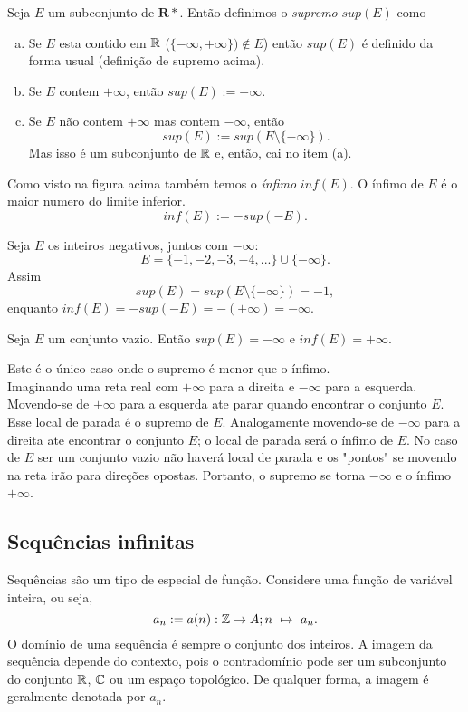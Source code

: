       \begin{definition}
         Seja $E$ um subconjunto de $\mathbf{R*}$. Então definimos o 
         \emph{supremo} $sup(E)$ como 
         \begin{enumerate}[(a)]
            \item 
               Se $E$ esta contido em $\mathbb{R}$ ($\{-\infty,+\infty\}) \notin E$) 
               então $sup(E)$ é definido da forma usual (definição 
               de supremo acima).
            \item
               Se $E$ contem $+\infty$, então $sup(E) := +\infty$.
            \item
               Se $E$ não contem $+\infty$ mas contem $-\infty$, então 
               $$sup(E):= sup(E\setminus \{-\infty\}).$$ Mas isso 
               é um subconjunto de $\mathbb{R}$ e, então, cai no item (a).
         \end{enumerate}
         Como visto na figura acima também temos o \emph{ínfimo} $inf(E)$. 
         O ínfimo de $E$ é o maior numero do limite inferior.
         $$inf(E):=-sup(-E).$$
      \end{definition}
      \begin{exmp}
         Seja $E$ os inteiros negativos, juntos com $-\infty$:
         $$E = \{-1,-2,-3,-4,...\}\cup \{-\infty\}.$$
         Assim $$sup(E) = sup(E\setminus \{-\infty\}) = -1,$$
         enquanto $inf(E) = -sup(-E)=-(+\infty)=-\infty$.
      \end{exmp}
      \begin{stat}
         Seja $E$ um conjunto vazio. Então $sup(E) = -\infty$ e 
         $inf(E) = +\infty$.
      \end{stat}
      Este é o único caso onde o supremo é menor que o ínfimo.\\
      Imaginando uma reta real com $+\infty$ para a direita e $-\infty$ 
      para a esquerda. Movendo-se de $+\infty$ para a esquerda 
      ate parar quando encontrar o conjunto $E$. Esse local de parada 
      é o supremo de $E$. Analogamente movendo-se de $-\infty$ para 
      a direita ate encontrar o conjunto $E$; o local de parada será 
      o ínfimo de $E$. No caso de $E$ ser um conjunto vazio não 
      haverá local de parada e os "pontos" se movendo na reta 
      irão para direções opostas. Portanto, o supremo se torna 
      $-\infty$ e o ínfimo $+\infty$.
   \subsection{Sequências infinitas}
      Sequências são um tipo de especial de função. 
      Considere uma função de variável inteira, ou seja, 
      $$a_{n} := a(n): \mathbb{Z} \to A; n\ \mapsto\ a_{n}.$$
      O domínio de uma sequência é sempre o conjunto dos inteiros. 
      A imagem da sequência depende do contexto, pois o 
      contradomínio pode ser um subconjunto do conjunto 
      $\mathbb{R}$, $\mathbb{C}$ ou um espaço topológico. 
      De qualquer forma, a imagem é geralmente denotada por $a_{n}$.
